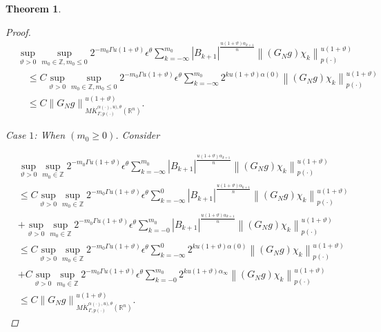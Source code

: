 \documentclass[oneside,reqno]{amsart}
\newtheorem{theorem}{Theorem}[section]
\numberwithin{equation}{section}
\theoremstyle{definition}
\begin{document}
\begin{theorem}
\begin{proof}
\begin{align*}
& \sup_{\vartheta>0 } \sup _{m_0\in  \mathbb{Z}, m_0\leq 0} 2^{-m_0\Gamma u(1+\vartheta)}\epsilon  ^\theta \sum_{k=-\infty}^{m_0}\left|B_{k+1}\right|^{\frac{u(1+\vartheta) \alpha_{k+1}} { n}}\left\|\left(G_{N}g \right) \chi_{k}\right\|_{{p(\cdot)}}^{u(1+\vartheta)} \\
& \quad \leq  C \sup_{\vartheta>0 } \sup _{m_0\in  \mathbb{Z}, m_0\leq 0} 2^{-m_0\Gamma u(1+\vartheta)}\epsilon  ^\theta \sum_{k=-\infty}^{m_0} 2^{k u(1+\vartheta) \alpha(0)}\left\|\left(G_{N}g \right) \chi_{k}\right\|_{{p(\cdot)}}^{u(1+\vartheta)}  \\
& \quad \leq C\left\|G_{N}g \right\|_{M \dot{K} ^{\alpha(\cdot),u),\theta}_{ \Gamma, p(\cdot)}(\mathbb{R}^n)}^{u(1+\vartheta)} .
\end{align*}


Case $1$: When $(m_0\geq 0)$. Consider


\begin{align*}
&\sup_{\vartheta>0 } \sup _{m_0\in  \mathbb{Z}} 2^{-m_0\Gamma u(1+\vartheta)}\epsilon  ^\theta \sum_{k=-\infty}^{m_0}\left|B_{k+1}\right|^{\frac{u(1+\vartheta) \alpha_{k+1}} { n}}\left\|\left(G_{N}g \right) \chi_{k}\right\|_{{p(\cdot)}}^{u(1+\vartheta)} \\
& \leq C \sup_{\vartheta>0 } \sup _{m_0\in  \mathbb{Z}} 2^{-m_0\Gamma u(1+\vartheta)}\epsilon  ^\theta \sum_{k=-\infty}^{0}\left|B_{k+1}\right|^{\frac{u(1+\vartheta) \alpha_{k+1}} { n}}\left\|\left(G_{N}g \right) \chi_{k}\right\|_{{p(\cdot)}}^{u(1+\vartheta)} \\
& +\sup_{\vartheta>0 } \sup _{m_0\in  \mathbb{Z}} 2^{-m_0\Gamma u(1+\vartheta)}\epsilon  ^\theta \sum_{k=-0}^{m_0}\left|B_{k+1}\right|^{\frac{u(1+\vartheta) \alpha_{k+1}} { n}}\left\|\left(G_{N}g \right) \chi_{k}\right\|_{{p(\cdot)}}^{u(1+\vartheta)} \\
& \leq C \sup_{\vartheta>0 } \sup _{m_0\in  \mathbb{Z}} 2^{-m_0\Gamma u(1+\vartheta)}\epsilon  ^\theta \sum_{k=-\infty}^{0}2^{k u(1+\vartheta) \alpha(0)}\left\|\left(G_{N}g \right) \chi_{k}\right\|_{{p(\cdot)}}^{u(1+\vartheta)} \\
& +C\sup_{\vartheta>0 } \sup _{m_0\in  \mathbb{Z}} 2^{-m_0\Gamma u(1+\vartheta)}\epsilon  ^\theta \sum_{k=-0}^{m_0}2^{k u(1+\vartheta) \alpha_\infty}\left\|\left(G_{N}g \right) \chi_{k}\right\|_{{p(\cdot)}}^{u(1+\vartheta)} \\
 & \leq C\left\|G_{N}g \right\|_{M \dot{K} ^{\alpha(\cdot),u),\theta}_{ \Gamma, p(\cdot)}(\mathbb{R}^n)}^{u(1+\vartheta)} .
\end{align*}



\end{proof}
\end{theorem}
\end{document}

